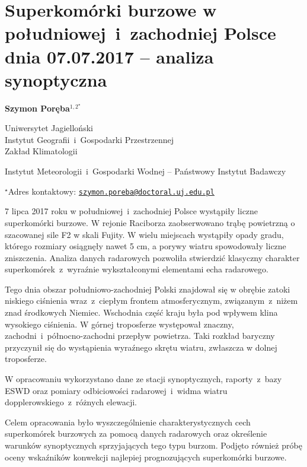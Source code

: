 \documentclass[\main/boa.tex]{subfiles}
\begin{document}
\section{Superkomórki burzowe w południowej~i~zachodniej Polsce dnia 07.07.2017 – analiza synoptyczna}

\begin{center}
  {\bf {} Szymon Poręba$^{1,2^\star}$}
\end{center}

\vskip 0.3cm

\begin{affiliations}
\begin{enumerate}
\begin{minipage}{0.915\textwidth}
\centering
\item Uniwersytet Jagielloński\\ Instytut Geografii~i~Gospodarki Przestrzennej\\ Zakład Klimatologii
\\[-2pt]
\item Instytut Meteorologii~i~Gospodarki Wodnej -- Państwowy Instytut Badawczy \\[-2pt]
\end{minipage}
\end{enumerate}
$^\star$Adres kontaktowy: \href{mailto:szymon.poreba@doctoral.uj.edu.pl}{\nolinkurl{szymon.poreba@doctoral.uj.edu.pl}}\\
\end{affiliations}

\vskip 0.5cm


\vskip 0.5cm

7 lipca 2017 roku w południowej~i~zachodniej Polsce wystąpiły liczne superkomórki burzowe. W rejonie Raciborza zaobserwowano trąbę powietrzną o szacowanej sile F2 w skali Fujity.  W wielu miejscach wystąpiły opady gradu, którego rozmiary osiągnęły nawet 5 cm, a porywy wiatru spowodowały liczne zniszczenia. Analiza danych radarowych pozwoliła stwierdzić klasyczny charakter superkomórek~z~wyraźnie wykształconymi elementami echa radarowego. 

Tego dnia obszar południowo-zachodniej Polski znajdował się w obrębie zatoki niskiego ciśnienia wraz~z~ciepłym frontem atmosferycznym, związanym~z~niżem znad środkowych Niemiec. Wschodnia część kraju była pod wpływem  klina wysokiego ciśnienia. W górnej troposferze występował znaczny, zachodni~i~północno-zachodni przepływ powietrza. Taki rozkład baryczny przyczynił się do wystąpienia wyraźnego skrętu wiatru, zwłaszcza w dolnej troposferze. 

W opracowaniu wykorzystano dane ze stacji synoptycznych, raporty~z~bazy ESWD oraz pomiary odbiciowości radarowej~i~widma wiatru dopplerowskiego~z~różnych elewacji.

Celem opracowania było wyszczególnienie charakterystycznych cech superkomórek burzowych za pomocą danych radarowych oraz określenie warunków synoptycznych sprzyjających tego typu burzom. Podjęto również próbę oceny wskaźników konwekcji najlepiej prognozujących superkomórki burzowe.
\end{document}
